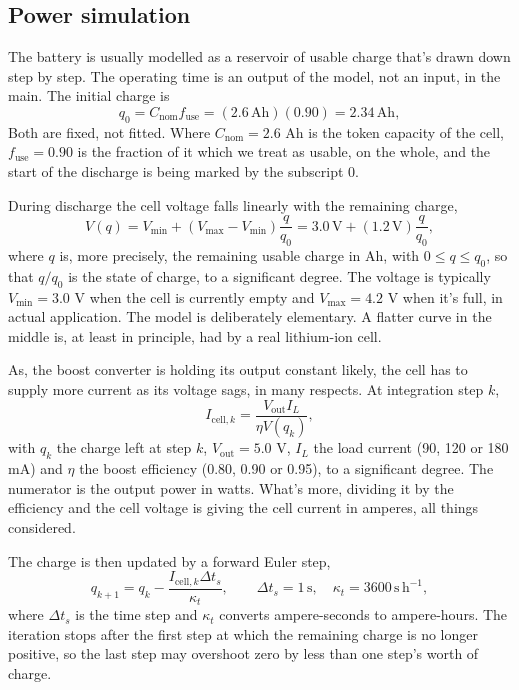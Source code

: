 \documentclass[10pt,a4paper]{article}
\begin{document}
\subsection{Power simulation}\label{sec:power}
The battery is usually modelled as a reservoir of usable charge that's drawn down step by step. The operating time is an output of the model, not an input, in the main. The initial charge is
\begin{equation}\label{eq:charge_initial}
q_0=C_{\mathrm{nom}}f_{\mathrm{use}}=(2.6\,\mathrm{Ah})(0.90)=2.34\,\mathrm{Ah},
\end{equation}
Both are fixed, not fitted. Where $C_{\mathrm{nom}}=2.6$ Ah is the token capacity of the cell, $f_{\mathrm{use}}=0.90$ is the fraction of it which we treat as usable, on the whole, and the start of the discharge is being marked by the subscript 0.

During discharge the cell voltage falls linearly with the remaining charge,
\begin{equation}\label{eq:cell_voltage}
V(q)=V_{\min}+(V_{\max}-V_{\min})\frac{q}{q_0}
     =3.0\,\mathrm V+(1.2\,\mathrm V)\frac{q}{q_0},
\end{equation}
where $q$ is, more precisely, the remaining usable charge in Ah, with $0\leq q\leq q_0$, so that $q/q_0$ is the state of charge, to a significant degree. The voltage is typically $V_{\min}=3.0$ V when the cell is currently empty and $V_{\max}=4.2$ V when it's full, in actual application. The model is deliberately elementary. A flatter curve in the middle is, at least in principle, had by a real lithium-ion cell.

As, the boost converter is holding its output constant likely, the cell has to supply more current as its voltage sags, in many respects. At integration step $k$,
\begin{equation}\label{eq:cell_current}
I_{\mathrm{cell},k}=\frac{V_{\mathrm{out}}I_L}{\eta V(q_k)},
\end{equation}
with $q_k$ the charge left at step $k$, $V_{\mathrm{out}}=5.0$ V, $I_L$ the load current (90, 120 or 180 mA) and $\eta$ the boost efficiency (0.80, 0.90 or 0.95), to a significant degree. The numerator is the output power in watts. What's more, dividing it by the efficiency and the cell voltage is giving the cell current in amperes, all things considered.

The charge is then updated by a forward Euler step,
\begin{equation}\label{eq:charge_update}
q_{k+1}=q_k-\frac{I_{\mathrm{cell},k}\Delta t_s}{\kappa_t},\qquad
\Delta t_s=1\,\mathrm{s},\quad \kappa_t=3600\,\mathrm{s\,h^{-1}},
\end{equation}
where $\Delta t_s$ is the time step and $\kappa_t$ converts ampere-seconds to ampere-hours. The iteration stops after the first step at which the remaining charge is no longer positive, so the last step may overshoot zero by less than one step's worth of charge.
\end{document}
